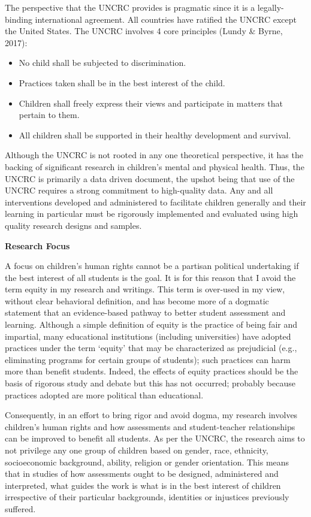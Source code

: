 \documentclass[
]{book}
\begin{document}
The perspective that the UNCRC provides is pragmatic since it is a legally-binding international agreement. All countries have ratified the UNCRC except the United States. The UNCRC involves 4 core principles (Lundy \& Byrne, 2017):

\begin{itemize}
\item
  No child shall be subjected to discrimination.
\item
  Practices taken shall be in the best interest of the child.
\item
  Children shall freely express their views and participate in matters that pertain to them.
\item
  All children shall be supported in their healthy development and survival.
\end{itemize}

Although the UNCRC is not rooted in any one theoretical perspective, it has the backing of significant research in children's mental and physical health. Thus, the UNCRC is primarily a data driven document, the upshot being that use of the UNCRC requires a strong commitment to high-quality data. Any and all interventions developed and administered to facilitate children generally and their learning in particular must be rigorously implemented and evaluated using high quality research designs and samples.

\textbf{Research Focus}

A focus on children's human rights cannot be a partisan political undertaking if the best interest of all students is the goal. It is for this reason that I avoid the term equity in my research and writings. This term is over-used in my view, without clear behavioral definition, and has become more of a dogmatic statement that an evidence-based pathway to better student assessment and learning. Although a simple definition of equity is the practice of being fair and impartial, many educational institutions (including universities) have adopted practices under the term `equity' that may be characterized as prejudicial (e.g., eliminating programs for certain groups of students); such practices can harm more than benefit students. Indeed, the effects of equity practices should be the basis of rigorous study and debate but this has not occurred; probably because practices adopted are more political than educational.

Consequently, in an effort to bring rigor and avoid dogma, my research involves children's human rights and how assessments and student-teacher relationships can be improved to benefit all students. As per the UNCRC, the research aims to not privilege any one group of children based on gender, race, ethnicity, socioeconomic background, ability, religion or gender orientation. This means that in studies of how assessments ought to be designed, administered and interpreted, what guides the work is what is in the best interest of children irrespective of their particular backgrounds, identities or injustices previously suffered.
\end{document}
